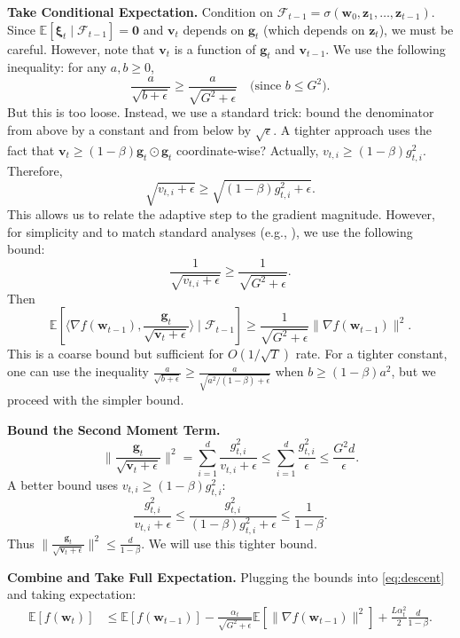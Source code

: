 \documentclass{article}
\newcommand{\E}{\mathbb{E}}
\newcommand{\norm}[1]{\|#1\|}
\newcommand{\inner}[2]{\langle #1, #2 \rangle}
\newcommand{\grad}{\nabla}
\newcommand{\step}[1]{\text{[Step #1]}}
\newcommand{\vect}[1]{\bm{#1}}
\begin{document}
\step{3} \textbf{Take Conditional Expectation.} Condition on \(\mathcal{F}_{t-1} = \sigma(\vect{w}_0, \vect{z}_1, \dots, \vect{z}_{t-1})\). Since \(\E[\vect{\xi}_t \mid \mathcal{F}_{t-1}] = \vect{0}\) and \(\vect{v}_t\) depends on \(\vect{g}_t\) (which depends on \(\vect{z}_t\)), we must be careful. However, note that \(\vect{v}_t\) is a function of \(\vect{g}_t\) and \(\vect{v}_{t-1}\). We use the following inequality: for any \(a,b \ge 0\),
\[
\frac{a}{\sqrt{b + \epsilon}} \ge \frac{a}{\sqrt{G^2 + \epsilon}} \quad \text{(since } b \le G^2\text{)}.
\]
But this is too loose. Instead, we use a standard trick: bound the denominator from above by a constant and from below by \(\sqrt{\epsilon}\). A tighter approach uses the fact that \(\vect{v}_t \ge (1-\beta) \vect{g}_t \odot \vect{g}_t\) coordinate-wise? Actually, \(v_{t,i} \ge (1-\beta) g_{t,i}^2\). Therefore,
\[
\sqrt{v_{t,i} + \epsilon} \ge \sqrt{(1-\beta) g_{t,i}^2 + \epsilon}.
\]
This allows us to relate the adaptive step to the gradient magnitude. However, for simplicity and to match standard analyses (e.g., \cite{ward2019adagrad}), we use the following bound:
\[
\frac{1}{\sqrt{v_{t,i} + \epsilon}} \ge \frac{1}{\sqrt{G^2 + \epsilon}}.
\]
Then
\[
\E \left[ \inner{\grad f(\vect{w}_{t-1})}{\frac{\vect{g}_t}{\sqrt{\vect{v}_t + \epsilon}}} \mid \mathcal{F}_{t-1} \right] \ge \frac{1}{\sqrt{G^2 + \epsilon}} \norm{\grad f(\vect{w}_{t-1})}^2.
\]
This is a coarse bound but sufficient for \(O(1/\sqrt{T})\) rate. For a tighter constant, one can use the inequality \(\frac{a}{\sqrt{b+\epsilon}} \ge \frac{a}{\sqrt{a^2/(1-\beta) + \epsilon}}\) when \(b \ge (1-\beta)a^2\), but we proceed with the simpler bound.

\step{4} \textbf{Bound the Second Moment Term.}
\[
\norm{\frac{\vect{g}_t}{\sqrt{\vect{v}_t + \epsilon}}}^2 = \sum_{i=1}^d \frac{g_{t,i}^2}{v_{t,i} + \epsilon} \le \sum_{i=1}^d \frac{g_{t,i}^2}{\epsilon} \le \frac{G^2 d}{\epsilon}.
\]
A better bound uses \(v_{t,i} \ge (1-\beta) g_{t,i}^2\):
\[
\frac{g_{t,i}^2}{v_{t,i} + \epsilon} \le \frac{g_{t,i}^2}{(1-\beta) g_{t,i}^2 + \epsilon} \le \frac{1}{1-\beta}.
\]
Thus \(\norm{\frac{\vect{g}_t}{\sqrt{\vect{v}_t + \epsilon}}}^2 \le \frac{d}{1-\beta}\). We will use this tighter bound.

\step{5} \textbf{Combine and Take Full Expectation.} Plugging the bounds into \eqref{eq:descent} and taking expectation:
\begin{align}
\E[f(\vect{w}_t)] &\le \E[f(\vect{w}_{t-1})] - \frac{\alpha_t}{\sqrt{G^2 + \epsilon}} \E[\norm{\grad f(\vect{w}_{t-1})}^2] + \frac{L \alpha_t^2}{2} \frac{d}{1-\beta}. \label{eq:telescope}
\end{align}
\end{document}
